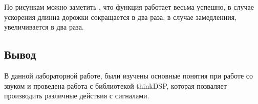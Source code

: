 По рисункам можно заметить , что функция работает весьма успешно, в случае ускорения длинна дорожки сокращается в два раза, в случае замедленния, увеличивается в два раза.



\subsection{Вывод}
В данной лабораторной работе, были изучены основные понятия при работе со звуком и проведена работа с библиотекой thinkDSP, которая позваляет производить различные действия с сигналами.